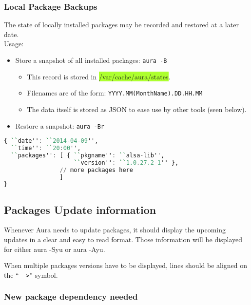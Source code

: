 \documentclass{article}
\begin{document}
\subsubsection{Local Package Backups}
The state of locally installed packages may be recorded and restored
at a later date.\\
Usage:
\begin{itemize}
\itemsep1pt\parskip0pt
\item Store a snapshot of all installed packages:
  \colorbox{Apricot}{\texttt{aura -B}}
  \begin{itemize}
    \item This record is stored in
      \colorbox{GreenYellow}{/var/cache/aura/states}.
    \item Filenames are of the form: \texttt{YYYY.MM(MonthName).DD.HH.MM}
    \item The data itself is stored as JSON to ease use by other tools
      (seen below).
  \end{itemize}
\item Restore a snapshot: \colorbox{Apricot}{\texttt{aura -Br}}
\end{itemize}

\begin{shaded}
\begin{lstlisting}[language=haskell]
{ ``date'': ``2014-04-09'',
  ``time'': ``20:00'',
  ``packages'': [ { ``pkgname'': ``alsa-lib'',
                    ``version'': ``1.0.27.2-1'' },
                // more packages here
                ]
}
\end{lstlisting}
\end{shaded}


\subsection{Packages Update information}

Whenever Aura needs to update packages, it should display the upcoming updates
in a clear and easy to read format. Those information will be displayed for
either \colorbox{Apricot}{aura -Syu} or \colorbox{Apricot}{aura -Ayu}.

When multiple packages versions have to be displayed, lines should be aligned
on the “\texttt{-\/->}” symbol.

\subsubsection{New package dependency needed}
\end{document}

